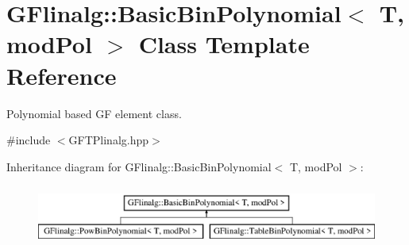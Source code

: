 \hypertarget{class_g_flinalg_1_1_basic_bin_polynomial}{}\section{G\+Flinalg\+::Basic\+Bin\+Polynomial$<$ T, mod\+Pol $>$ Class Template Reference}
\label{class_g_flinalg_1_1_basic_bin_polynomial}


Polynomial based GF element class.  




{\ttfamily \#include $<$G\+F\+T\+Plinalg.\+hpp$>$}

Inheritance diagram for G\+Flinalg\+::Basic\+Bin\+Polynomial$<$ T, mod\+Pol $>$\+:\begin{figure}[H]
\begin{center}
\leavevmode
\includegraphics[height=2.000000cm]{class_g_flinalg_1_1_basic_bin_polynomial}
\end{center}
\end{figure}
